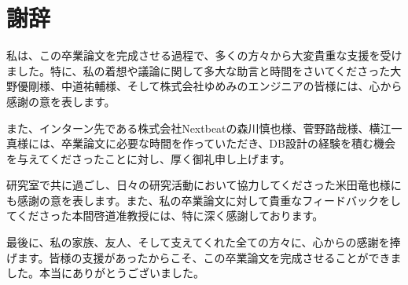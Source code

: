 \documentclass[../../main]{subfiles}
\begin{document}
    \section{謝辞}\label{sec:acknowledgment}

    私は、この卒業論文を完成させる過程で、多くの方々から大変貴重な支援を受けました。特に、私の着想や議論に関して多大な助言と時間をさいてくださった大野優剛様、中道祐輔様、そして株式会社ゆめみのエンジニアの皆様には、心から感謝の意を表します。

    また、インターン先である株式会社Nextbeatの森川慎也様、菅野路哉様、横江一真様には、卒業論文に必要な時間を作っていただき、DB設計の経験を積む機会を与えてくださったことに対し、厚く御礼申し上げます。

    研究室で共に過ごし、日々の研究活動において協力してくださった米田竜也様にも感謝の意を表します。また、私の卒業論文に対して貴重なフィードバックをしてくださった本間啓道准教授には、特に深く感謝しております。

    最後に、私の家族、友人、そして支えてくれた全ての方々に、心からの感謝を捧げます。皆様の支援があったからこそ、この卒業論文を完成させることができました。本当にありがとうございました。

    \clearpage
\end{document}
